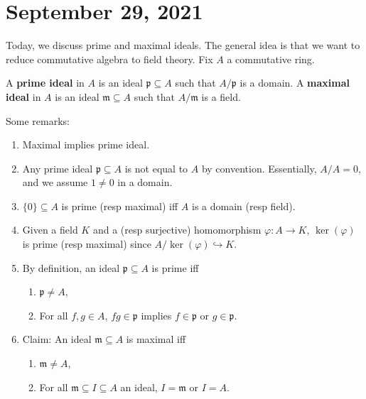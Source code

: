 \section{September 29, 2021} 
Today, we discuss prime and maximal ideals. The general idea is that we want to reduce commutative algebra to field theory. Fix $A$ a commutative ring.
\begin{definition}[]
    A \textbf{prime ideal} in $A$ is an ideal $\mathfrak p \subseteq A$ such that $A / \mathfrak p$ is a domain. A \textbf{maximal ideal} in $A$ is an ideal $\mathfrak m \subseteq A$ such that $A / \mathfrak m$ is a field.
\end{definition}
\begin{remark}Some remarks:
    \begin{enumerate}[label=(\arabic*)]
    \setlength\itemsep{-.2em}
        \item Maximal implies prime ideal.
        \item Any prime ideal $\mathfrak p \subseteq A$ is not equal to $A$ by convention. Essentially, $A / A =0$, and we assume $1 \neq 0$ in a domain.
        \item $\{0\} \subseteq A$ is prime (resp maximal) iff $A$ is a domain (resp field).
        \item Given a field $K$ and a (resp surjective) homomorphism $\varphi  \colon A \to K$, $\ker (\varphi )$ is prime (resp maximal) since $A / \ker (\varphi ) \hookrightarrow  K$.
        \item By definition, an ideal  $\mathfrak p \subseteq A$ is prime iff
            \begin{enumerate}[label=(\alph*)]
            \setlength\itemsep{-.2em}
                \item $\mathfrak p \neq A$,
                \item For all $f,g \in A$, $fg \in \mathfrak p$ implies $f \in \mathfrak p$ or $g \in \mathfrak p$.
            \end{enumerate}
        \item Claim: An ideal $\mathfrak m \subseteq A$ is maximal iff
            \begin{enumerate}[label=(\alph*)]
            \setlength\itemsep{-.2em}
                \item $\mathfrak m \neq A$,
                \item For all $\mathfrak m \subseteq I \subseteq A$ an ideal, $I=\mathfrak m$ or $I=A$.
            \end{enumerate}
    \end{enumerate}
\end{remark}
